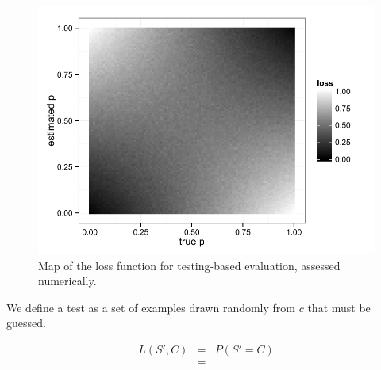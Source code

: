 \documentclass[10pt,letterpaper]{article}
\begin{document}
\begin{figure}[t]
\begin{center}
\includegraphics[width=5.5in]{figures/loss1.pdf}
\end{center}
\caption{\label{fig:loss1} Map of the loss function for testing-based evaluation, assessed numerically.}
\end{figure}

We define a test as a set of examples drawn randomly from $c$ that must be guessed. 

\begin{eqnarray}
L(S',C) &=& P(S' = C) \\
&=&
\end{eqnarray}





\end{document}
